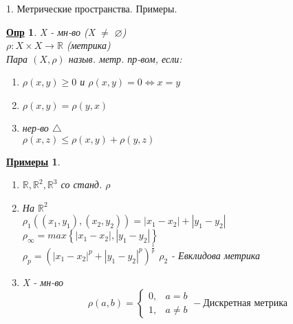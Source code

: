 \documentclass[12pt, fleqn]{article}
\newenvironment{question}[1]{\hspace*{-4em} #1}{\newpage}
\newcommand{\R}{\mathbb{R}}
\theoremstyle{nonumbermarginbreak}
\newtheorem{definition}{\hspace*{-2em}\underline{\bfseries Опр}}[section]
\newtheorem{examples}{\hspace*{-2em}\underline{\bfseries Примеры}}[section]
\begin{document}
    \begin{question}{1. Метрические пространства. Примеры.}
        \begin{definition} 
            X - мн-во (X $\neq$ $\varnothing$) \\
            $\rho: X \times X \rightarrow \R$ (метрика)\\
            Пара $(X, \rho)$ назыв. метр. пр-вом, если:\\
            \begin{enumerate} 
                \item $\rho(x, y) \geq 0$ и $\rho(x, y) = 0 \Leftrightarrow x = y$ 
                \item $\rho(x, y) = \rho(y, x)$
                \item нер-во $\bigtriangleup$ \\ $\rho(x, z) \leq \rho(x, y) + \rho(y, z)$
            \end{enumerate}
        \end{definition}

        \begin{examples}
            \begin{enumerate}
                \item $\R, \R^2, \R^3$ со станд. $\rho$
                \item На $\R^2$\\
                      $\rho_1((x_1, y_1), (x_2, y_2)) = |x_1 - x_2| + |y_1 - y_2|$\\
                      $\rho_\infty = max\left\{|x_1 - x_2|, |y_1 - y_2|\right\}$\\
                      $\rho_p = (|x_1 - x_2|^p + |y_1 - y_2|^p)^{\frac{1}{p}}$
                      $\rho_2$ - Евклидова метрика
                \item X - мн-во\\
                    \[\rho(a, b) =  \begin{cases}
                            0, &a = b\\
                            1, &a \neq b
                                \end{cases}- \text{Дискретная метрика}\]
            \end{enumerate}
        \end{examples}

    \end{question}
    
\end{document}
